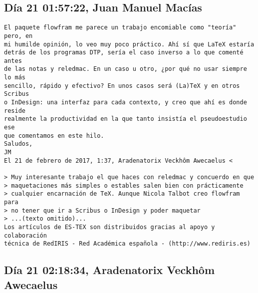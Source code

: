 \documentclass[a4paper,10pt]{article}
\begin{document}
\subsection{Día 21 01:57:22, Juan Manuel Macías}

\begin{lstlisting}
El paquete flowfram me parece un trabajo encomiable como "teoría" pero, en
mi humilde opinión, lo veo muy poco práctico. Ahí sí que LaTeX estaría
detrás de los programas DTP, sería el caso inverso a lo que comenté antes
de las notas y reledmac. En un caso u otro, ¿por qué no usar siempre lo más
sencillo, rápido y efectivo? En unos casos será (La)TeX y en otros Scribus
o InDesign: una interfaz para cada contexto, y creo que ahí es donde reside
realmente la productividad en la que tanto insistía el pseudoestudio ese
que comentamos en este hilo.
Saludos,
JM
El 21 de febrero de 2017, 1:37, Aradenatorix Veckhôm Awecaelus <

> Muy interesante trabajo el que haces con reledmac y concuerdo en que
> maquetaciones más simples o estables salen bien con prácticamente
> cualquier encarnación de TeX. Aunque Nicola Talbot creo flowfram para
> no tener que ir a Scribus o InDesign y poder maquetar
> ...(texto omitido)...
Los artículos de ES-TEX son distribuidos gracias al apoyo y colaboración 
técnica de RedIRIS - Red Académica española - (http://www.rediris.es)

\end{lstlisting}

\subsection{Día 21 02:18:34, Aradenatorix Veckhôm Awecaelus}
\end{document}
